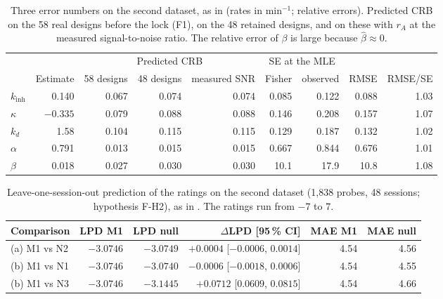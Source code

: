 \documentclass[12pt,a4paper]{article}
\theoremstyle{plain}
\theoremstyle{definition}
\theoremstyle{remark}
\newcommand{\kinh}{k_{\mathrm{inh}}}
\newcommand{\kd}{k_{d}}
\newcommand{\rA}{r_{A}}
\begin{document}
\begin{table}[H]
\centering\footnotesize
\caption{Three error numbers on the second dataset, as in  (rates in min$^{-1}$; relative errors). Predicted CRB on the 58 real designs before the lock (F1), on the 48 retained designs, and on these with $\rA$ at the measured signal-to-noise ratio. The relative error of $\beta$ is large because $\hat\beta\approx0$.}
\label{tab:osf-errors}
\setlength{\tabcolsep}{3.5pt}
\begin{tabular}{lrrrrrrrr}
\toprule
 & & \multicolumn{3}{c}{Predicted CRB} & \multicolumn{2}{c}{SE at the MLE} & & \\
\cmidrule(lr){3-5}\cmidrule(lr){6-7}
 & Estimate & 58 designs & 48 designs & measured SNR & Fisher & observed & RMSE & RMSE/SE \\
\midrule
$\kinh$  & 0.140    & 0.067 & 0.074 & 0.074 & 0.085 & 0.122 & 0.088 & 1.03 \\
$\kappa$ & $-0.335$ & 0.079 & 0.088 & 0.088 & 0.146 & 0.208 & 0.157 & 1.07 \\
$\kd$    & 1.58     & 0.104 & 0.115 & 0.115 & 0.129 & 0.187 & 0.132 & 1.02 \\
$\alpha$ & 0.791    & 0.013 & 0.015 & 0.015 & 0.667 & 0.844 & 0.676 & 1.01 \\
$\beta$  & 0.018    & 0.027 & 0.030 & 0.030 & 10.1  & 17.9  & 10.8  & 1.08 \\
\bottomrule
\end{tabular}
\end{table}

\begin{table}[H]
\centering\footnotesize
\caption{Leave-one-session-out prediction of the ratings on the second dataset (1{,}838 probes, 48 sessions; hypothesis F-H2), as in . The ratings run from $-7$ to $7$.}
\label{tab:osf-loso}
\setlength{\tabcolsep}{4pt}
\begin{tabular}{lrrrrr}
\toprule
Comparison & LPD M1 & LPD null & $\Delta$LPD [95\,\% CI] & MAE M1 & MAE null \\
\midrule
(a) M1 vs N2 & $-3.0746$ & $-3.0749$ & $+0.0004$ [$-0.0006$, $0.0014$] & 4.54 & 4.56 \\
(b) M1 vs N1 & $-3.0746$ & $-3.0740$ & $-0.0006$ [$-0.0018$, $0.0006$] & 4.54 & 4.55 \\
(b) M1 vs N3 & $-3.0746$ & $-3.1445$ & $+0.0712$ [$0.0609$, $0.0815$] & 4.54 & 4.66 \\
\bottomrule
\end{tabular}
\end{table}
\end{document}
